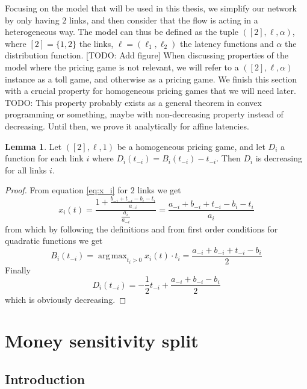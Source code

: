 \documentclass[10pt,a4paper]{book}
\DeclareMathOperator*{\argmax}{arg\,max}
\theoremstyle{definition}
\newtheorem{lemma}[definition]{Lemma}
\theoremstyle{comment}
\begin{document}
Focusing on the model that will be used in this thesis, we simplify our network by only having $2$ links, and then consider that the flow is acting in a heterogeneous way.
The model can thus be defined as the tuple $([2], \ell, \alpha)$, where $[2] = \{1, 2\}$ the links, $\ell = (\ell_1, \ell_2)$ the latency functions and $\alpha$ the distribution function.
[TODO: Add figure]
When discussing properties of the model where the pricing game is not relevant, we will refer to a $([2], \ell, \alpha)$ instance as a toll game, and otherwise as a pricing game.
We finish this section with a crucial property for homogeneous pricing games that we will need later.
TODO: This property probably exists as a general theorem in convex programming or something, maybe with non-decreasing property instead of decreasing. Until then, we prove it analytically for affine latencies.

\begin{lemma}
	\label{lemma:tolls_diff}
	Let $([2], \ell, 1)$ be a homogeneous pricing game, and let $D_i$ a function for each link $i$ where $D_i(t_{-i}) = B_i(t_{-i}) - t_{-i}$.
	Then $D_i$ is decreasing for all links $i$.
\end{lemma}

\begin{proof}
	From equation \ref{eq:x_i} for $2$ links we get
	\[
		x_i(t) = \frac{1 + \frac{b_{-i} + t_{-i} - b_i - t_i}{a_{-i}}}{\frac{a_i}{a_{-i}}} = \frac{a_{-i} + b_{-i} + t_{-i} - b_i - t_i}{a_i}
	\]
	from which by following the definitions and from first order conditions for quadratic functions we get
	\[
		B_i(t_{-i}) = \argmax_{t_i > 0}x_i(t) \cdot t_i = \frac{a_{-i} + b_{-i} + t_{-i} - b_i}{2}
	\]
	Finally
	\[
		D_i(t_{-i}) = -\frac{1}{2}t_{-i} + \frac{a_{-i} + b_{-i} - b_i}{2}
	\]
	which is obviously decreasing.
\end{proof}


\chapter{Money sensitivity split}

\section{Introduction}
\end{document}
